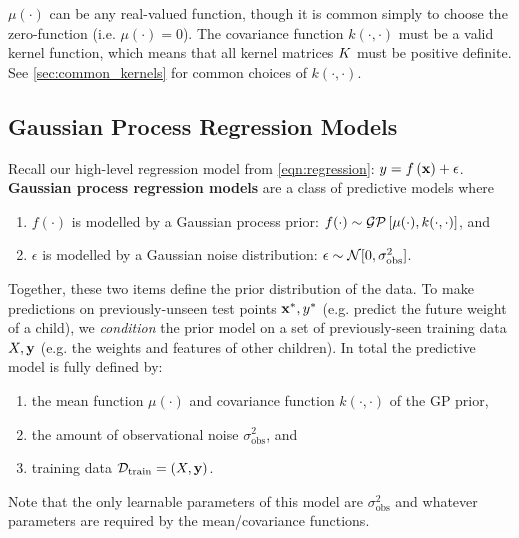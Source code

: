 $\mu(\cdot)$ can be any real-valued function, though it is common simply to choose the zero-function (i.e. $\mu(\cdot) = 0$).
The covariance function $k(\cdot, \cdot)$ must be a valid kernel function, which means that all kernel matrices $K$ must be positive definite.
See \cref{sec:common_kernels} for common choices of $k(\cdot, \cdot)$.

\subsection{Gaussian Process Regression Models}
\label{sec:gp_models}

Recall our high-level regression model from \cref{eqn:regression}: $y = f \left( \mathbf{x} \right) + \epsilon$.
{\bf Gaussian process regression models} are a class of predictive models where
%
\begin{enumerate}
  \item $f ( \cdot )$ is modelled by a Gaussian process prior: $f (\cdot) \sim \mathcal{GP} \left[ \mu(\cdot), k(\cdot, \cdot) \right]$, and
  \item $\epsilon$ is modelled by a Gaussian noise distribution: $\epsilon \sim \normaldist{0}{\sigma_\text{obs}^2}$.
\end{enumerate}
%
Together, these two items define the prior distribution of the data.
To make predictions on previously-unseen test points $\mathbf{x}^*, y^*$ (e.g. predict the future weight of a child), we \emph{condition} the prior model on a set of previously-seen training data $X, \mathbf{y}$ (e.g. the weights and features of other children).
In total the predictive model is fully defined by:
\begin{enumerate}
  \item the mean function $\mu(\cdot)$ and covariance function $k(\cdot, \cdot)$ of the GP prior,
  \item the amount of observational noise $\sigma_\text{obs}^2$, and
  \item training data $\mathcal D_\text{train} = (X, \mathbf{y})$.
\end{enumerate}
%
Note that the only learnable parameters of this model are $\sigma_\text{obs}^2$ and whatever parameters are required by the mean/covariance functions.

